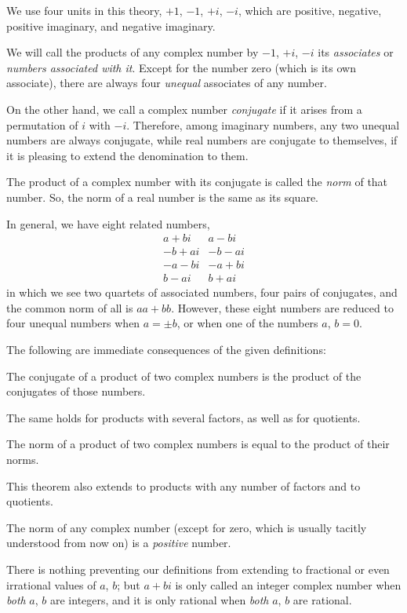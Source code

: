\documentclass[twoside,12pt]{memoir}
\begin{document}
We use four units in this theory, \(+1\), \(-1\), \(+i\), \(-i\), which are positive, negative, positive imaginary, and negative imaginary.
  
We will call the products of any complex number by \(-1\), \(+i\), \(-i\) its \textit{associates} or \textit{numbers associated with it}. Except for the number zero (which is its own associate), there are always four \textit{unequal} associates of any number.

On the other hand, we call a complex number \textit{conjugate} if it arises from a permutation of \(i\) with \(-i\). Therefore, among imaginary numbers, any two unequal numbers are always conjugate, while real numbers are conjugate to themselves, if it is pleasing to extend the denomination to them.
  
The product of a complex number with its conjugate is called the \textit{norm} of that number. So, the norm of a real number is the same as its square.
  
In general, we have eight related numbers, 
\[\begin{array}{r|r}
a+bi & a-bi \\
-b+ai & -b-ai \\
-a-bi & -a+bi \\
b-ai & b+ai
\end{array}\]
in which we see two quartets of associated numbers, four pairs of conjugates, and the common norm of all is \(a a+b b\).  However, these eight numbers are reduced to four unequal numbers when \(a= \pm b\), or when one of the numbers \(a\), \(b=0\).
  
The following are immediate consequences of the given definitions:

The conjugate of a product of two complex numbers is the product of the conjugates of those numbers.

The same holds for products with several factors, as well as for quotients.

The norm of a product of two complex numbers is equal to the product of their norms.

This theorem also extends to products with any number of factors and to quotients.
  
The norm of any complex number (except for zero, which is usually tacitly understood from now on) is a \textit{positive} number.
  
There is nothing preventing our definitions from extending to fractional or even irrational values of \(a\), \(b\); but \(a+bi\) is only called an integer complex number when \textit{both} \(a\), \(b\) are integers, and it is only rational when \textit{both} \(a\), \(b\) are rational.\pagebreak%
\end{document}
